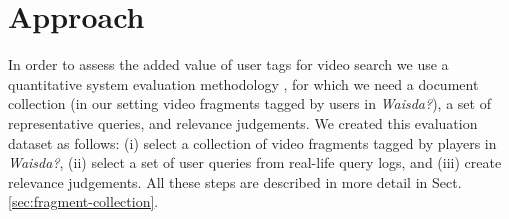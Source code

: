 \section{Approach}\label{sec:approach}
In order to assess the added value of user tags for video search we use a quantitative system evaluation methodology \cite{vorhees}, for which we need a document collection (in our setting video fragments tagged by users in \textit{Waisda?}), a set of representative queries, and relevance judgements.
We created this evaluation dataset as follows: (i) select a collection of video fragments tagged by players in \textit{Waisda?}, (ii) select a set of user queries from real-life query logs, and (iii) create relevance judgements. All these steps are described in more detail in Sect. \ref{sec:fragment-collection}.
